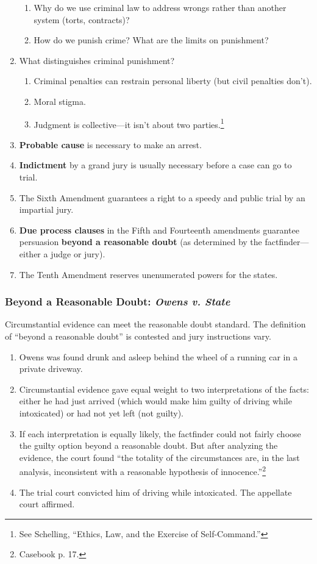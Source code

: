 \begin{enumerate}
\begin{enumerate}
        \item Why do we use criminal law to address wrongs rather than another 
        system (torts, contracts)?
        \item How do we punish crime? What are the limits on punishment?
    \end{enumerate}
    \item What distinguishes criminal punishment?
    \begin{enumerate}
        \item Criminal penalties can restrain personal liberty (but civil 
        penalties don't).
        \item Moral stigma.
        \item Judgment is collective---it isn't about two 
        parties.\footnote{See Schelling, ``Ethics, Law, and the Exercise of 
        Self-Command.''}
    \end{enumerate}
    \item \textbf{Probable cause} is necessary to make an arrest.
    \item \textbf{Indictment} by a grand jury is usually necessary before a 
    case can go to trial.
    \item The Sixth Amendment guarantees a right to a speedy and public trial
    by an impartial jury.
    \item \textbf{Due process clauses} in the Fifth and Fourteenth amendments 
    guarantee persuasion \textbf{beyond a reasonable doubt} (as determined by 
    the factfinder---either a judge or jury).
    \item The Tenth Amendment reserves unenumerated powers for the states.
\end{enumerate}

\subsubsection{Beyond a Reasonable Doubt: \emph{Owens v. State}}

Circumstantial evidence can meet the reasonable doubt standard. The definition 
of ``beyond a reasonable doubt'' is contested and jury instructions vary.

\begin{enumerate}
    \item Owens was found drunk and asleep behind the wheel of a running car 
    in a private driveway.
    \item Circumstantial evidence gave equal weight to two interpretations of 
    the facts: either he had just arrived (which would make him guilty of 
    driving while intoxicated) or had not yet left (not guilty).
    \item If each interpretation is equally likely, the factfinder could not 
    fairly choose the guilty option beyond a reasonable doubt. But after 
    analyzing the evidence, the court found ``the totality of the 
    circumstances are, in the last analysis, inconsistent with a reasonable 
    hypothesis of innocence.''\footnote{Casebook p. 17.}
    \item The trial court convicted him of driving while intoxicated. The 
    appellate court affirmed.
\end{enumerate}

